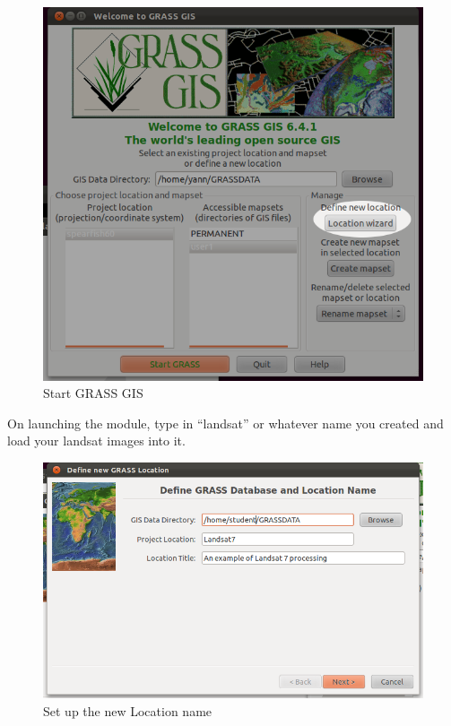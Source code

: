 \begin{figure}[htbp]
   \centering
   \includegraphics[scale=0.35]{grass_rs000.png}
   \caption{Start GRASS GIS}
   \label{fig:grass_rs000}
\end{figure}

On launching the module, type in ``landsat'' or whatever name you created and load your landsat images into it.

\begin{figure}[htbp]
   \centering
   \includegraphics[scale=0.35]{grass_rs001.png}
   \caption{Set up the new Location name}
   \label{fig:grass_rs001}
\end{figure}

